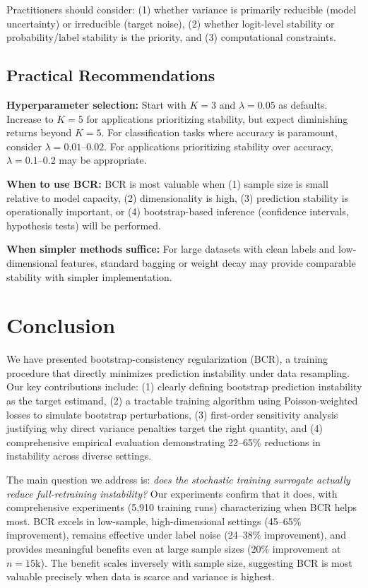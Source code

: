 \documentclass[12pt, letterpaper]{article}
\begin{document}
Practitioners should consider: (1) whether variance is primarily reducible (model uncertainty) or irreducible (target noise), (2) whether logit-level stability or probability/label stability is the priority, and (3) computational constraints.

\subsection{Practical Recommendations}

\textbf{Hyperparameter selection:} Start with $K=3$ and $\lambda=0.05$ as defaults. Increase to $K=5$ for applications prioritizing stability, but expect diminishing returns beyond $K=5$. For classification tasks where accuracy is paramount, consider $\lambda=0.01$--$0.02$. For applications prioritizing stability over accuracy, $\lambda=0.1$--$0.2$ may be appropriate.

\textbf{When to use BCR:} BCR is most valuable when (1) sample size is small relative to model capacity, (2) dimensionality is high, (3) prediction stability is operationally important, or (4) bootstrap-based inference (confidence intervals, hypothesis tests) will be performed.

\textbf{When simpler methods suffice:} For large datasets with clean labels and low-dimensional features, standard bagging or weight decay may provide comparable stability with simpler implementation.

\section{Conclusion}

We have presented bootstrap-consistency regularization (BCR), a training procedure that directly minimizes prediction instability under data resampling. Our key contributions include: (1) clearly defining bootstrap prediction instability as the target estimand, (2) a tractable training algorithm using Poisson-weighted losses to simulate bootstrap perturbations, (3) first-order sensitivity analysis justifying why direct variance penalties target the right quantity, and (4) comprehensive empirical evaluation demonstrating 22--65\% reductions in instability across diverse settings.

The main question we address is: \emph{does the stochastic training surrogate actually reduce full-retraining instability?} Our experiments confirm that it does, with comprehensive experiments (5,910 training runs) characterizing when BCR helps most. BCR excels in low-sample, high-dimensional settings (45--65\% improvement), remains effective under label noise (24--38\% improvement), and provides meaningful benefits even at large sample sizes (20\% improvement at $n=15$k). The benefit scales inversely with sample size, suggesting BCR is most valuable precisely when data is scarce and variance is highest.
\end{document}
